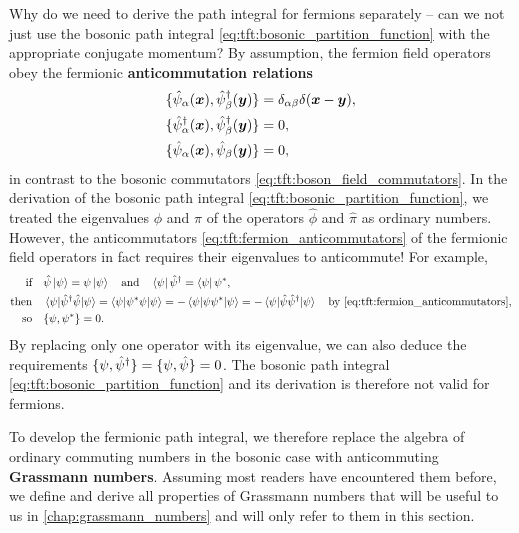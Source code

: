 Why do we need to derive the path integral for fermions separately -- can we not just use the bosonic path integral \eqref{eq:tft:bosonic_partition_function} with the appropriate conjugate momentum?
By assumption, the fermion field operators obey the fermionic \textbf{anticommutation relations}
\begin{equation}
\begin{split}
	\{ \hat\psi_\alpha({\bm{x}}) , \hat\psi^\dagger_\beta({\bm{y}}) \} &= \delta_{\alpha \beta} \delta({\bm{x}}-{\bm{y}}) , \\
	\{ \hat\psi^\dagger_\alpha({\bm{x}}) , \hat\psi^\dagger_\beta({\bm{y}}) \} &= 0 , \\
	\{ \hat\psi_\alpha({\bm{x}}) , \hat\psi_\beta({\bm{y}}) \} &= 0 ,
\end{split}
\label{eq:tft:fermion_anticommutators}
\end{equation}
in contrast to the bosonic commutators \eqref{eq:tft:boson_field_commutators}.
In the derivation of the bosonic path integral \eqref{eq:tft:bosonic_partition_function}, we treated the eigenvalues $\phi$ and $\pi$ of the operators $\hat\phi$ and $\hat\pi$ as ordinary numbers.
However, the anticommutators \eqref{eq:tft:fermion_anticommutators} of the fermionic field operators in fact requires their eigenvalues to anticommute!
For example,
\begin{equation}
\begin{split}
	\text{if}   \quad & \hat\psi \ket{\psi} = \psi \ket{\psi} \quad \text{and} \quad \bra{\psi} \hat\psi^\dagger = \bra{\psi} {\psi}^* , \\
	\text{then} \quad & \braket{\psi | \hat\psi^\dagger \hat\psi | \psi} = \braket{\psi | {\psi}^* \psi | \psi} = -\braket{\psi | \psi {\psi}^* | \psi} = -\braket{\psi | \hat\psi \hat\psi^\dagger | \psi} \quad \text{by \eqref{eq:tft:fermion_anticommutators}}, \\
	\text{so}   \quad & \{ \psi , {\psi}^* \} = 0 . \\
\end{split}
\label{eq:tft:eigenvalues_must_anticommute}
\end{equation}
By replacing only one operator with its eigenvalue, we can also deduce the requirements $\{ \psi , \hat\psi^\dagger \} = \{ \psi , \hat\psi \} = 0$.
The bosonic path integral \eqref{eq:tft:bosonic_partition_function} and its derivation is therefore not valid for fermions.

To develop the fermionic path integral, we therefore replace the algebra of ordinary commuting numbers in the bosonic case with anticommuting \textbf{Grassmann numbers}.
Assuming most readers have encountered them before, we define and derive all properties of Grassmann numbers that will be useful to us in \cref{chap:grassmann_numbers} and will only refer to them in this section.

